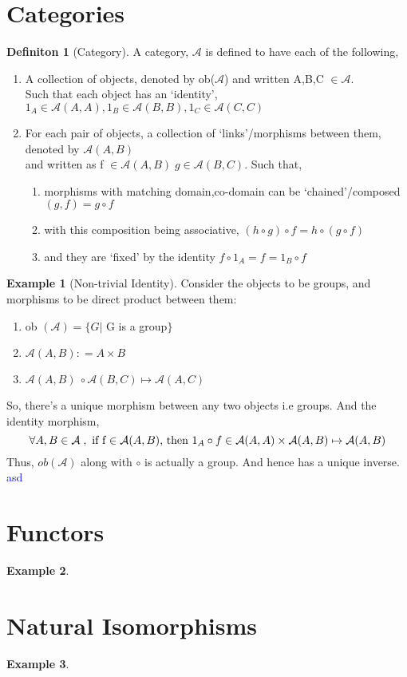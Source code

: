 \documentclass{article}
\theoremstyle{definition}
\newtheorem{example}{Example}[section]
\theoremstyle{definition}
\newtheorem{definition}{Definiton}[section]
\begin{document}
\section{Categories} \label{sec:Categories}
\begin{definition}[Category] %
A category, $\mathcal{A}$ is defined to have each of the following,
\begin{enumerate}[label=(\roman*)]
	\item A collection of objects, denoted by ob($\mathcal{A}$) and written A,B,C $\in \mathcal{A}$.\\
		Such that each object has an `identity', $ 1_A \in \mathcal{A}(A,A) , 1_B \in \mathcal{A}(B,B), 1_C \in \mathcal{A}(C,C)$
	\item For each pair of objects, a collection of `links'/morphisms between them, denoted by $\mathcal{A}(A,B)$ \\and written as f $ \in \mathcal{A}(A,B) \; g \in \mathcal{A}(B,C) $. Such that,
		\begin{enumerate}[label=(\alph*)]
			\item morphisms with matching domain,co-domain can be `chained'/composed $ (g,f)=g \circ f $
			\item with this composition being associative, $ (h \circ g)\circ f=h \circ ( g \circ f) $
			\item and they are `fixed' by the identity $ f \circ 1_A =f= 1_B \circ f $
		\end{enumerate}
\end{enumerate}
\end{definition}

\begin{example} [Non-trivial Identity]
Consider the objects to be groups, and morphisms to be direct product between them:
\begin{enumerate}[label=\roman*]%
	\item ob $ (\mathcal{A}) = \{ G | $  G is a group$ \} $
	\item $  \mathcal{A}(A,B) : = A \times B $
	\item  $ \mathcal{A}(A,B) \ \circ \mathcal{A}(B,C) \mapsto \mathcal{A}(A,C) $
\end{enumerate}
So, there's a unique morphism between any two objects i.e groups. And the identity morphism,
\[ \forall A,B  \in \mathbb{\mathcal{A} }\;, \text{ if f $ \in \mathcal{A}(A,B)$, then }   1_A \circ f \in \mathcal{A}(A,A) \times \mathcal{A}(A,B) \mapsto \mathcal{A}(A,B) \]
Thus, $ ob(\mathcal{A} ) $ along with $ \circ  $ is actually a group. And hence has a unique inverse.
\textcolor{blue} {asd}
\end{example}
\section{Functors}
\label{sec:Functors}
\begin{example}
\end{example}

\section{Natural Isomorphisms}
\label{sec:Natural Isomorphisms}
\begin{example}
\end{example}
\end{document}
